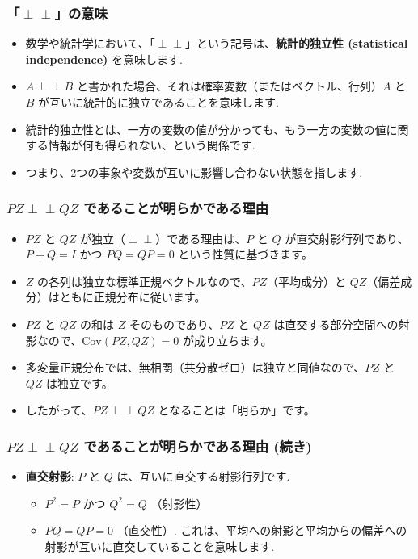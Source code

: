 \documentclass{beamer}
\begin{document}
\begin{frame}
\frametitle{「$\perp\perp$」の意味}
\begin{itemize}
    \item 数学や統計学において、「$\perp\perp$」という記号は、\textbf{統計的独立性 (statistical independence)} を意味します.
    \item $A\perp\perp B$ と書かれた場合、それは確率変数（またはベクトル、行列）$A$ と $B$ が互いに統計的に独立であることを意味します.
    \item 統計的独立性とは、一方の変数の値が分かっても、もう一方の変数の値に関する情報が何も得られない、という関係です.
    \item つまり、2つの事象や変数が互いに影響し合わない状態を指します.
\end{itemize}
\end{frame}

\begin{frame}
\frametitle{$PZ\perp\perp QZ$ であることが明らかである理由}
\begin{itemize}
    \item $PZ$ と $QZ$ が独立（$\perp\perp$）である理由は、$P$ と $Q$ が直交射影行列であり、$P+Q=I$ かつ $PQ=QP=0$ という性質に基づきます。
    \item $Z$ の各列は独立な標準正規ベクトルなので、$PZ$（平均成分）と $QZ$（偏差成分）はともに正規分布に従います。
    \item $PZ$ と $QZ$ の和は $Z$ そのものであり、$PZ$ と $QZ$ は直交する部分空間への射影なので、$\mathrm{Cov}(PZ, QZ) = 0$ が成り立ちます。
    \item 多変量正規分布では、無相関（共分散ゼロ）は独立と同値なので、$PZ$ と $QZ$ は独立です。
    \item したがって、$PZ \perp\perp QZ$ となることは「明らか」です。
\end{itemize}
\end{frame}

\begin{frame}
\frametitle{$PZ\perp\perp QZ$ であることが明らかである理由 (続き)}
\begin{itemize}
    \item \textbf{直交射影}: $P$ と $Q$ は、互いに直交する射影行列です.
    \begin{itemize}
        \item $P^2=P$ かつ $Q^2=Q$ （射影性）
        \item $PQ=QP=0$ （直交性）. これは、平均への射影と平均からの偏差への射影が互いに直交していることを意味します.
    \end{itemize}
\end{itemize}
\end{frame}
\end{document}
